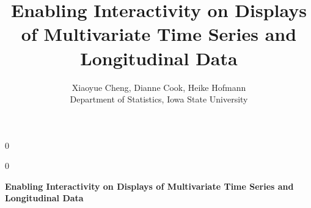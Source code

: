 \documentclass[12pt]{article}
\newcommand{\blind}{0}
\begin{document}
\def\spacingset#1{\renewcommand{\baselinestretch}%
{#1}\small\normalsize} \spacingset{1}


\blind
{
  \title{\bf  Enabling Interactivity on Displays of Multivariate Time Series and Longitudinal Data}
  \author{Xiaoyue Cheng,
    Dianne Cook, Heike Hofmann \\
    Department of Statistics, Iowa State University
    }
  \maketitle
} \fi

\blind
{
  \bigskip
  \bigskip
  \bigskip
  \begin{center}
    {\LARGE\bf Enabling Interactivity on Displays of Multivariate Time Series and Longitudinal Data}
\end{center}
  \medskip
} \fi
\end{document}
